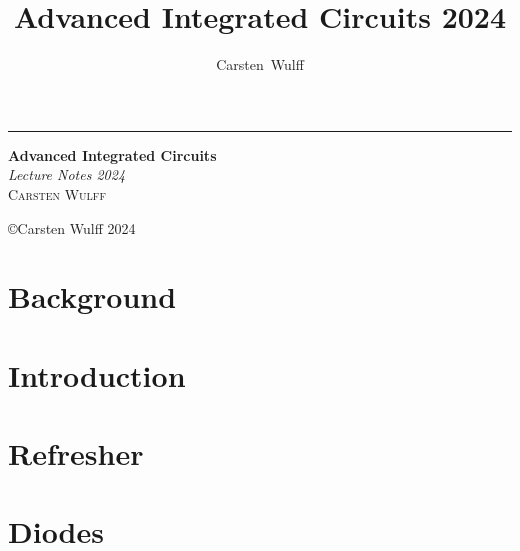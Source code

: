\documentclass[11pt,twoside,openright]{book}
\title{Advanced Integrated Circuits 2024}
\author{Carsten~Wulff}
\date{}
\begin{document}
\begin{titlepage} %

	\raggedleft %

	\rule{1pt}{\textheight} %
	\hspace{0.05\textwidth} %
	\parbox[b]{0.75\textwidth}{ %

		{\Huge\bfseries Advanced Integrated Circuits}\\[2\baselineskip] %
		{\large\textit{Lecture Notes 2024}}\\[4\baselineskip] %
		{\Large\textsc{Carsten Wulff}} %

		\vspace{0.5\textheight} %

    

		{\noindent \copyright Carsten Wulff 2024}\\[\baselineskip] %
	}

\end{titlepage}



{
\hypersetup{linkcolor=}
\setcounter{tocdepth}{2}
\tableofcontents
}



\mainmatter

\chapter{Background}


\chapter{Introduction}


\chapter{Refresher}


\chapter{Diodes}

\end{document}
